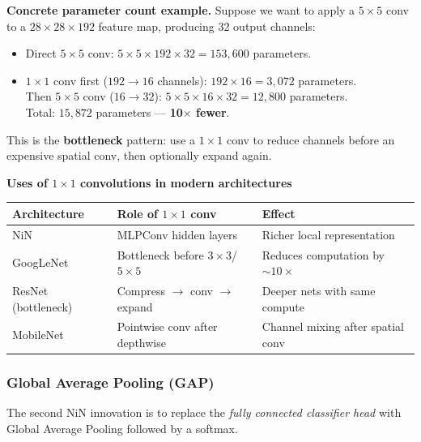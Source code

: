 \documentclass[11pt,a4paper]{article}
\newcommand{\term}[1]{\textcolor{DefGreen}{\textbf{#1}}\index{#1}}
\begin{document}
\textbf{Concrete parameter count example.}  Suppose we want to apply a $5\times5$ conv to a $28\times28\times192$ feature map, producing 32 output channels:
\begin{itemize}
  \item Direct $5\times5$ conv: $5\times5\times192\times32 = 153{,}600$ parameters.
  \item $1\times1$ conv first ($192\to16$ channels): $192\times16 = 3{,}072$ parameters.\\
    Then $5\times5$ conv ($16\to32$): $5\times5\times16\times32 = 12{,}800$ parameters.\\
    Total: $15{,}872$ parameters — \textbf{10$\times$ fewer}.
\end{itemize}
This is the \term{bottleneck} pattern: use a $1\times1$ conv to reduce channels before an expensive spatial conv, then optionally expand again.

\begin{tcolorbox}[colback=LightBlue,colframe=AccentBlue,boxrule=0.8pt,arc=3pt]
\textbf{Uses of $1\times1$ convolutions in modern architectures}
\begin{center}
\renewcommand{\arraystretch}{1.25}
\begin{tabular}{@{}lll@{}}
\toprule
\textbf{Architecture} & \textbf{Role of $1\times1$ conv} & \textbf{Effect} \\
\midrule
NiN & MLPConv hidden layers & Richer local representation \\
GoogLeNet & Bottleneck before $3\times3$/$5\times5$ & Reduces computation by $\sim10\times$ \\
ResNet (bottleneck) & Compress $\to$ conv $\to$ expand & Deeper nets with same compute \\
MobileNet & Pointwise conv after depthwise & Channel mixing after spatial conv \\
\bottomrule
\end{tabular}
\end{center}
\end{tcolorbox}

\subsubsection{Global Average Pooling (GAP)}

The second NiN innovation is to replace the \emph{fully connected classifier head} with Global Average Pooling followed by a softmax.
\end{document}
